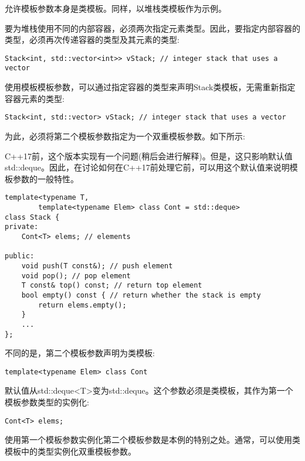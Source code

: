允许模板参数本身是类模板。同样，以堆栈类模板作为示例。

要为堆栈使用不同的内部容器，必须两次指定元素类型。因此，要指定内部容器的类型，必须再次传递容器的类型及其元素的类型:

\begin{lstlisting}[style=styleCXX]
Stack<int, std::vector<int>> vStack; // integer stack that uses a vector
\end{lstlisting}

使用模板模板参数，可以通过指定容器的类型来声明Stack类模板，无需重新指定容器元素的类型:

\begin{lstlisting}[style=styleCXX]
Stack<int, std::vector> vStack; // integer stack that uses a vector
\end{lstlisting}

为此，必须将第二个模板参数指定为一个双重模板参数。如下所示:

\begin{tcolorbox}[colback=webgreen!5!white,colframe=webgreen!75!black]
\hspace*{0.75cm}C++17前，这个版本实现有一个问题(稍后会进行解释)。但是，这只影响默认值std::deque。因此，在讨论如何在C++17前处理它前，可以用这个默认值来说明模板参数的一般特性。
\end{tcolorbox}

\begin{lstlisting}[style=styleCXX]
template<typename T,
		template<typename Elem> class Cont = std::deque>
class Stack {
private:
	Cont<T> elems; // elements
	
public:
	void push(T const&); // push element
	void pop(); // pop element
	T const& top() const; // return top element
	bool empty() const { // return whether the stack is empty
		return elems.empty();
	}
	...
};
\end{lstlisting}

不同的是，第二个模板参数声明为类模板:

\begin{lstlisting}[style=styleCXX]
template<typename Elem> class Cont
\end{lstlisting}

默认值从std::deque<T>变为std::deque。这个参数必须是类模板，其作为第一个模板参数类型的实例化:

\begin{lstlisting}[style=styleCXX]
Cont<T> elems;
\end{lstlisting}

使用第一个模板参数实例化第二个模板参数是本例的特别之处。通常，可以使用类模板中的类型实例化双重模板参数。

